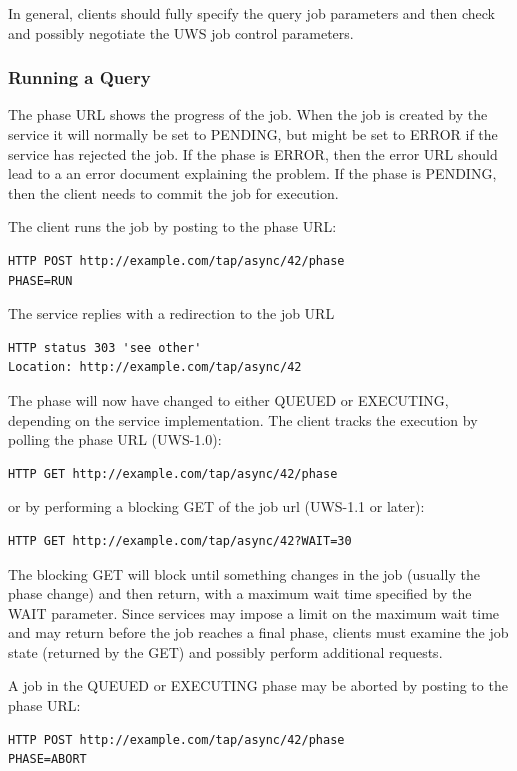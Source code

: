 \documentclass[11pt,letter]{ivoa}
\begin{document}
In general, clients should fully specify the query job parameters and then 
check and possibly negotiate the UWS job control parameters.

\subsubsection{Running a Query}
\label{sec:example-RunningQuery}
The phase URL shows the progress of the job. When the job is created by the 
service it will normally be set to PENDING, but might be set to ERROR if the 
service has rejected the job. If the phase is ERROR, then the error URL should 
lead to a an error document explaining the problem. If the phase is PENDING, 
then the client needs to commit the job for execution.

The client runs the job by posting to the phase URL:
\begin{verbatim}
HTTP POST http://example.com/tap/async/42/phase
PHASE=RUN
\end{verbatim}

The service replies with a redirection to the job URL
\begin{verbatim}
HTTP status 303 'see other'
Location: http://example.com/tap/async/42
\end{verbatim}
The phase will now have changed to either QUEUED or EXECUTING, depending on the 
service implementation. The client tracks the execution by polling the phase 
URL (UWS-1.0):
\begin{verbatim}
HTTP GET http://example.com/tap/async/42/phase
\end{verbatim}
or by performing a blocking GET of the job url (UWS-1.1 or later):
\begin{verbatim}
HTTP GET http://example.com/tap/async/42?WAIT=30
\end{verbatim}
The blocking GET will block until something changes in the job (usually the phase
change) and then return, with a maximum wait time specified by the WAIT parameter. Since
services may impose a limit on the maximum wait time and may return before the job reaches
a final phase, clients must examine the job state (returned by the GET) and possibly perform
additional requests.

A job in the  QUEUED or EXECUTING phase may be aborted by posting to the phase 
URL:
\begin{verbatim}
HTTP POST http://example.com/tap/async/42/phase
PHASE=ABORT
\end{verbatim}
\end{document}
